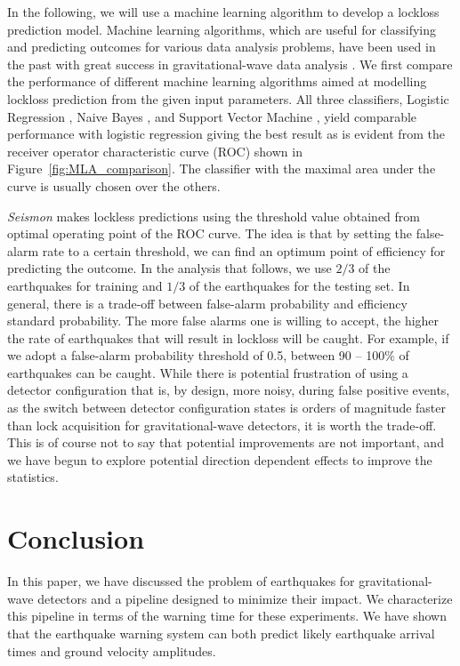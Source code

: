\documentclass[twocolumn, aps, superscriptaddress]{revtex4}
\begin{document}
In the following, we will use a machine learning algorithm to develop a lockloss prediction model. Machine learning algorithms, which are useful for classifying and predicting outcomes for various data analysis problems, have been used in the past with great success in gravitational-wave data analysis \cite{BiBl2013,KyHa2015}. We first compare the performance of different machine learning algorithms aimed at modelling lockloss prediction from the given input parameters.  All three classifiers, Logistic Regression \cite{mccullagh_glm}, Naive Bayes \cite{John_NaiveBayes}, and Support Vector Machine \cite{Burges_SVM}, yield comparable performance with logistic regression giving the best result as is evident from the receiver operator characteristic curve (ROC) shown in Figure~\ref{fig:MLA_comparison}. 
The classifier with the maximal area under the curve is usually chosen over the others. 

\emph{Seismon} makes lockless predictions using the threshold value obtained from optimal operating point of the ROC curve. 	
The idea is that by setting the false-alarm rate to a certain threshold, we can find an optimum point of efficiency for predicting the outcome. In the analysis that follows, we use $2/3$ of the earthquakes for training and  $1/3$ of the earthquakes for the testing set. 
In general, there is a trade-off between false-alarm probability and efficiency standard probability. The more false alarms one is willing to accept, the higher the rate of earthquakes that will result in lockloss will be caught. For example, if we adopt a false-alarm probability threshold of 0.5, between 90 -- 100\% of earthquakes can be caught. While there is potential frustration of using a detector configuration that is, by design, more noisy, during false positive events, as the switch between detector configuration states is orders of magnitude faster than lock acquisition for gravitational-wave detectors, it is worth the trade-off. This is of course not to say that potential improvements are not important, and we have begun to explore potential direction dependent effects to improve the statistics.

\section{Conclusion}
\label{sec:conclusions}

In this paper, we have discussed the problem of earthquakes for gravitational-wave detectors and a pipeline designed to minimize their impact. 
We characterize this pipeline in terms of the warning time for these experiments.
We have shown that the earthquake warning system can both predict likely earthquake arrival times and ground velocity amplitudes. 
\end{document}
